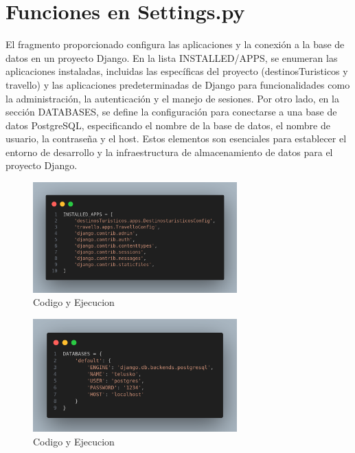 \documentclass[10pt, a4paper]{article}
\begin{document}
\section{Funciones en Settings.py}
El fragmento proporcionado configura las aplicaciones y la conexión a la base de datos en un proyecto Django. En la lista INSTALLED/APPS, se enumeran las aplicaciones instaladas, incluidas las específicas del proyecto (destinosTuristicos y travello) y las aplicaciones predeterminadas de Django para funcionalidades como la administración, la autenticación y el manejo de sesiones. Por otro lado, en la sección DATABASES, se define la configuración para conectarse a una base de datos PostgreSQL, especificando el nombre de la base de datos, el nombre de usuario, la contraseña y el host. Estos elementos son esenciales para establecer el entorno de desarrollo y la infraestructura de almacenamiento de datos para el proyecto Django.
\begin{figure}[H]
  \centering
  \includegraphics[width=0.7\textwidth]{img/settings-app-telusko.png}
  \caption{Codigo y Ejecucion}
\end{figure}

\begin{figure}[H]
  \centering
  \includegraphics[width=0.7\textwidth]{img/settings-db-telusko.png}
  \caption{Codigo y Ejecucion}
\end{figure}
\end{document}
